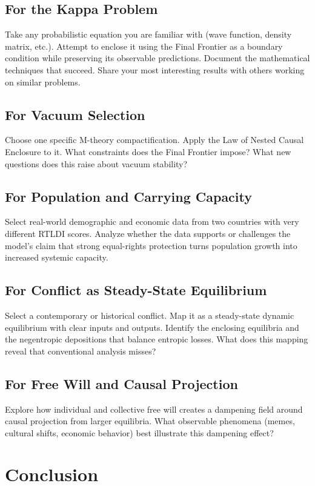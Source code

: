 \subsection{For the Kappa Problem}
Take any probabilistic equation you are familiar with (wave function, density matrix, etc.). Attempt to enclose it using the Final Frontier as a boundary condition while preserving its observable predictions. Document the mathematical techniques that succeed. Share your most interesting results with others working on similar problems.

\subsection{For Vacuum Selection}
Choose one specific M-theory compactification. Apply the Law of Nested Causal Enclosure to it. What constraints does the Final Frontier impose? What new questions does this raise about vacuum stability?

\subsection{For Population and Carrying Capacity}
Select real-world demographic and economic data from two countries with very different RTLDI scores. Analyze whether the data supports or challenges the model’s claim that strong equal-rights protection turns population growth into increased systemic capacity.

\subsection{For Conflict as Steady-State Equilibrium}
Select a contemporary or historical conflict. Map it as a steady-state dynamic equilibrium with clear inputs and outputs. Identify the enclosing equilibria and the negentropic depositions that balance entropic losses. What does this mapping reveal that conventional analysis misses?

\subsection{For Free Will and Causal Projection}
Explore how individual and collective free will creates a dampening field around causal projection from larger equilibria. What observable phenomena (memes, cultural shifts, economic behavior) best illustrate this dampening effect?

\section{Conclusion}

